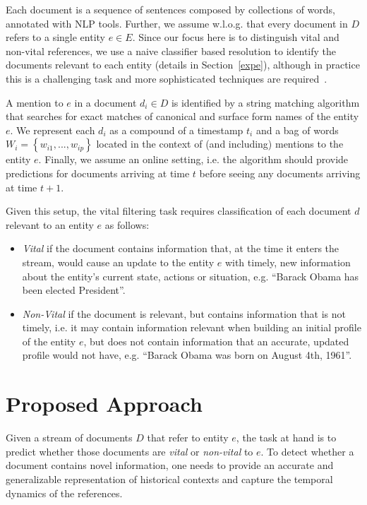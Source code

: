 \documentclass{sig-alternate}
\begin{document}
Each document is a sequence of sentences composed by collections of words, annotated with NLP tools.
Further, we assume w.l.o.g. that every document in $D$ refers to a single entity $e \in E$. %
Since our focus here is to distinguish vital and non-vital references, we use a naive classifier based resolution to identify the documents relevant to each entity (details in Section~\ref{expe}), although in practice this is a challenging task and more sophisticated techniques are required~\citep{RaoMD10,singh11:acl}.

A mention to $e$ in a document $d_i \in D$ is identified by a string matching algorithm that searches for exact matches of canonical and surface form names of the entity $e$.
We represent each $d_i$ as a compound of a timestamp $t_i$ and a bag of words $W_i = \left\{ {w_{i1}, ..., w_{ip}}\right\}$ located in the context of (and including) mentions to the entity $e$. 
Finally, we assume an online setting, i.e. the algorithm should provide predictions for documents arriving at time $t$ before seeing any documents arriving at time $t+1$.

Given this setup, the vital filtering task requires classification of each document $d$ relevant to an entity $e$ as follows:
\begin{itemize}
    \item \emph{Vital} if the document contains information that, at the time it enters the stream, would cause an update to the entity $e$ with timely, new information about the entity's current state, actions or situation, e.g. ``Barack Obama has been elected President''.
    \item \emph{Non-Vital} if the document is relevant, but contains information that is not timely, i.e. it may contain information relevant when building an initial profile of the entity $e$, but does not contain information that an accurate, updated profile would not have, e.g. ``Barack Obama was born on August 4th, 1961''.
\end{itemize}

\section{Proposed Approach}
\label{approach}

Given a stream of documents $D$ that refer to entity $e$, the task at hand is to predict whether those documents are \emph{vital} or \emph{non-vital} to $e$. 
To detect whether a document contains novel information, one needs to provide an accurate and generalizable representation of historical contexts and capture the temporal dynamics of the references.
\end{document}
